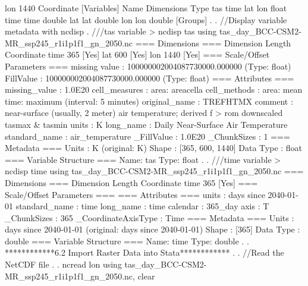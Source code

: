 lon                  1440     Coordinate     
{\smallskip}
[Variables]
Name                      Dimensions                     Type           
tas                       time lat lon                   float          
time                      time                           double         
lat                       lat                            double         
lon                       lon                            double         
{\smallskip}
[Groups]
{\smallskip}
. 
. //Display variable metadata with ncdisp
. ///tas variable
> ncdisp tas using tas_day_BCC-CSM2-MR_ssp245_r1i1p1f1_gn_2050.nc
{\smallskip}
=== Dimensions ===
Dimension       Length   Coordinate     
time            365      [Yes]          
lat             600      [Yes]          
lon             1440     [Yes]          
{\smallskip}
=== Scale/Offset Parameters ===
missing value  : 100000002004087730000.000000 (Type: float)
 FillValue     : 100000002004087730000.000000 (Type: float)
{\smallskip}
=== Attributes ===
missing_value       : 1.0E20
cell_measures       : area: areacella
cell_methods        : area: mean time: maximum (interval: 5 minutes)
original_name       : TREFHTMX
comment             : near-surface (usually, 2 meter) air temperature; derived f
> rom downscaled tasmax \& tasmin
units               : K
long_name           : Daily Near-Surface Air Temperature
standard_name       : air_temperature
_FillValue          : 1.0E20
_ChunkSizes         : 1
{\smallskip}
=== Metadata ===
Units          : K (original: K)
{\smallskip}
Shape          : [365, 600, 1440]
Data Type      : float
{\smallskip}
=== Variable Structure ===
Name: tas                       Type: float          
{\smallskip}
. 
. ///time variable
> ncdisp time using tas_day_BCC-CSM2-MR_ssp245_r1i1p1f1_gn_2050.nc
{\smallskip}
=== Dimensions ===
Dimension       Length   Coordinate     
time            365      [Yes]          
{\smallskip}
=== Scale/Offset Parameters ===
{\smallskip}
=== Attributes ===
units               : days since 2040-01-01
standard_name       : time
long_name           : time
calendar            : 365_day
axis                : T
_ChunkSizes         : 365
_CoordinateAxisType : Time
{\smallskip}
=== Metadata ===
Units          : days since 2040-01-01 (original: days since 2040-01-01)
{\smallskip}
Shape          : [365]
Data Type      : double
{\smallskip}
=== Variable Structure ===
Name: time                      Type: double         
{\smallskip}
. 
. ************6.2 Import Raster Data into Stata************
. 
. //Read the NetCDF file
. 
. ncread lon using tas_day_BCC-CSM2-MR_ssp245_r1i1p1f1_gn_2050.nc, clear 
